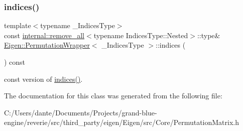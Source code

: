 \subsubsection{\texorpdfstring{indices()}{indices()}}
{\footnotesize\ttfamily template$<$typename \+\_\+\+Indices\+Type$>$ \\
const \mbox{\hyperlink{struct_eigen_1_1internal_1_1remove__all}{internal\+::remove\+\_\+all}}$<$typename Indices\+Type\+::\+Nested$>$\+::type\& \mbox{\hyperlink{class_eigen_1_1_permutation_wrapper}{Eigen\+::\+Permutation\+Wrapper}}$<$ \+\_\+\+Indices\+Type $>$\+::indices (\begin{DoxyParamCaption}{ }\end{DoxyParamCaption}) const\hspace{0.3cm}{\ttfamily [inline]}}

const version of \mbox{\hyperlink{class_eigen_1_1_permutation_base_a16fa3afafdf703399d62c80f950802f1}{indices()}}. 

The documentation for this class was generated from the following file\+:\begin{DoxyCompactItemize}
\item 
C\+:/\+Users/dante/\+Documents/\+Projects/grand-\/blue-\/engine/reverie/src/third\+\_\+party/eigen/\+Eigen/src/\+Core/Permutation\+Matrix.\+h\end{DoxyCompactItemize}
